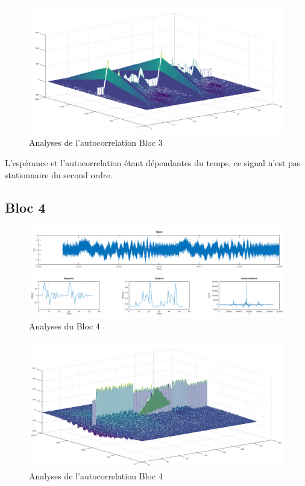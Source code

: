 \documentclass[french, a4paper, 12pt, openany]{book}
\begin{document}
	\begin{figure}[ht]
		\begin{center}
		\includegraphics[scale=0.25]{images/AutoCorrBloc3.png}
		\end{center}
		\caption{Analyses de l'autocorrelation Bloc 3}
		\label{Analyses de l'autocorrelation Bloc 3}
	\end{figure}

	L'espérance et l'autocorrelation étant dépendantes du temps, ce signal n'est pas stationnaire du second ordre.
  \subsection{Bloc 4}

	\begin{figure}[ht]
    \begin{center}
    \includegraphics[scale=0.25]{images/SignalBloc3.png}
    \end{center}
    \caption{Analyses du Bloc 4}
    \label{Analyses du Bloc 4}
  \end{figure}

	\begin{figure}[ht]
		\begin{center}
		\includegraphics[scale=0.25]{images/AutoCorrBloc4.png}
		\end{center}
		\caption{Analyses de l'autocorrelation Bloc 4}
		\label{Analyses de l'autocorrelation Bloc 4}
	\end{figure}
\end{document}
